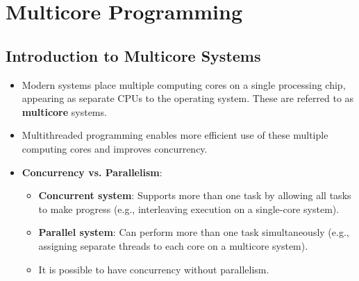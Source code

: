 \section{Multicore Programming}\label{sec:4.2}

\subsection{Introduction to Multicore Systems}
\begin{itemize}
    \item Modern systems place multiple computing cores on a single processing chip, appearing as separate CPUs to the operating system. These are referred to as \textbf{multicore} systems.
    \item Multithreaded programming enables more efficient use of these multiple computing cores and improves concurrency.
    \item \textbf{Concurrency vs. Parallelism}:
        \begin{itemize}
            \item \textbf{Concurrent system}: Supports more than one task by allowing all tasks to make progress (e.g., interleaving execution on a single-core system).
            \item \textbf{Parallel system}: Can perform more than one task simultaneously (e.g., assigning separate threads to each core on a multicore system).
            \item It is possible to have concurrency without parallelism.
        \end{itemize}
\end{itemize}


